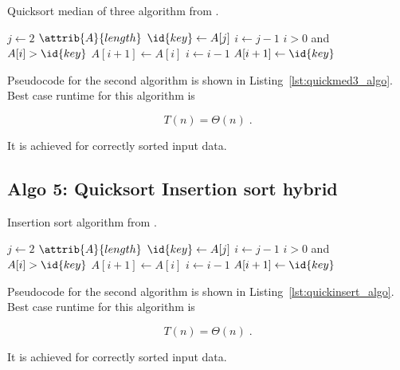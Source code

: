 \begin{algorithm}[H]
  \caption{Quicksort median of three algorithm from \cite[Ch.~2.1]{cormen_introduction_2009}.}
  \label{lst:quickmed3_algo}
  \begin{codebox}
    \li \For $j \gets 2$ \To $\attrib{A}{length}$
    \li \Do
    $\id{key} \gets A[j]$
    \li     $i \gets j-1$
    \li      \While $i>0$ and $A[i] > \id{key}$
    \li      \Do
    $A[i+1] \gets A[i]$
    \li         $i \gets i-1$
    \End    
    \li       $A[i+1]\gets \id{key}$
    \End
  \end{codebox}
\end{algorithm}

Pseudocode for the second algorithm is shown in
Listing~\ref{lst:quickmed3_algo}. Best case runtime for this algorithm
is

\begin{equation}
  T(n) = \Theta(n) \;.  \label{eq:ins_sort_best}
\end{equation}

It is achieved for correctly sorted input data.

\subsection{Algo 5: Quicksort Insertion sort hybrid}\label{sec:algo5}

\begin{algorithm}[H]
  \caption{Insertion sort algorithm from \cite[Ch.~2.1]{cormen_introduction_2009}.}
  \label{lst:quickinsert_algo}
  \begin{codebox}
    \li \For $j \gets 2$ \To $\attrib{A}{length}$
    \li \Do
    $\id{key} \gets A[j]$
    \li     $i \gets j-1$
    \li      \While $i>0$ and $A[i] > \id{key}$
    \li      \Do
    $A[i+1] \gets A[i]$
    \li         $i \gets i-1$
    \End    
    \li       $A[i+1]\gets \id{key}$
    \End
  \end{codebox}
\end{algorithm}

Pseudocode for the second algorithm is shown in
Listing~\ref{lst:quickinsert_algo}. Best case runtime for this algorithm
is

\begin{equation}
  T(n) = \Theta(n) \;.  \label{eq:ins_sort_best}
\end{equation}

It is achieved for correctly sorted input data.

